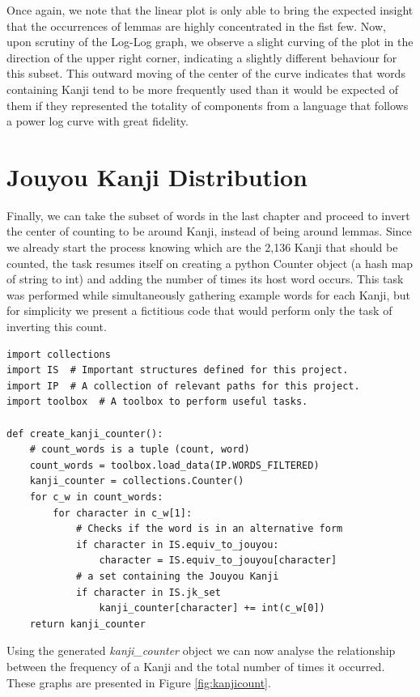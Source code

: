 Once again, we note that the linear plot is only able to bring the expected insight that the occurrences of lemmas are highly concentrated in the fist few. Now, upon scrutiny of the Log-Log graph, we observe a slight curving of the plot in the direction of the upper right corner, indicating a slightly different behaviour for this subset. This outward moving of the center of the curve indicates that words containing Kanji tend to be more frequently used than it would be expected of them if they represented the totality of components from a language that follows a power log curve with great fidelity.

\section{Jouyou Kanji Distribution}\label{freq:kanji}

Finally, we can take the subset of words in the last chapter and proceed to invert the center of counting to be around Kanji, instead of being around lemmas. Since we already start the process knowing which are the 2,136 Kanji that should be counted, the task resumes itself on creating a python Counter object (a hash map of string to int) and adding the number of times its host word occurs. This task was performed while simultaneously gathering example words for each Kanji, but for simplicity we present a fictitious code that would perform only the task of inverting this count.

\begin{verbatim}
import collections
import IS  # Important structures defined for this project.
import IP  # A collection of relevant paths for this project.
import toolbox  # A toolbox to perform useful tasks.

def create_kanji_counter():
    # count_words is a tuple (count, word)
    count_words = toolbox.load_data(IP.WORDS_FILTERED)
    kanji_counter = collections.Counter()
    for c_w in count_words:
        for character in c_w[1]:
            # Checks if the word is in an alternative form
            if character in IS.equiv_to_jouyou:
                character = IS.equiv_to_jouyou[character]
            # a set containing the Jouyou Kanji
            if character in IS.jk_set
                kanji_counter[character] += int(c_w[0])
    return kanji_counter
\end{verbatim}

Using the generated \textit{kanji\_counter} object we can now analyse the relationship between the frequency of a Kanji and the total number of times it occurred. These graphs are presented in Figure \ref{fig:kanjicount}.

